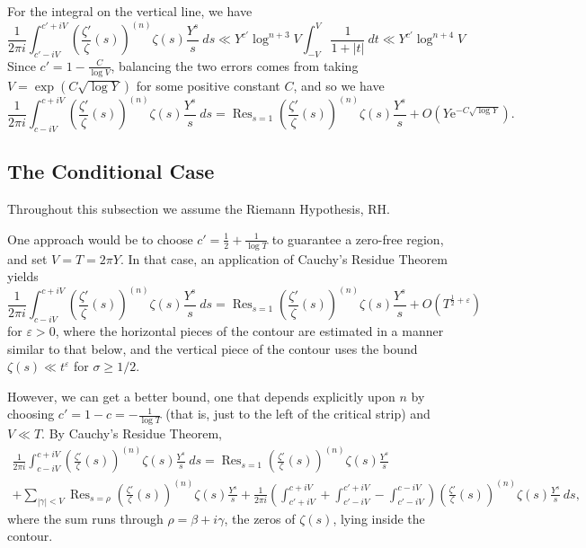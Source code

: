 \documentclass[12pt,a4paper,reqno]{amsart}
\DeclareMathOperator*{\Res}{Res}
\theoremstyle{remark}
\numberwithin{equation}{section}
\begin{document}
For the integral on the vertical line, we have
\[
    \frac{1}{2 \pi i } \int_{c' - iV}^{c' + iV} \left( \frac{\zeta'}{\zeta}(s) \right)^{(n)} \zeta(s) \frac{Y^s}{s} \ ds \ll Y^{c'} \log^{n+3} V \int_{-V}^{V} \frac{1}{1+|t|} \ dt  \ll  Y^{c'} \log^{n+4} V 
\]
Since $c' = 1-\frac{C}{\log V}$, balancing the two errors comes from taking $V = \exp(C\sqrt{\log Y})$ for some positive constant $C$, and so we have
\[
\frac{1}{2 \pi i } \int_{c- iV}^{c + iV}\left( \frac{\zeta'}{\zeta}(s) \right)^{(n)} \zeta(s) \frac{Y^s}{s} \ ds = \Res_{s=1} \left( \frac{\zeta'}{\zeta}(s) \right)^{(n)} \zeta(s) \frac{Y^s}{s} + O \left(Y \mathrm{e}^{-C \sqrt{\log Y}} \right).
\]




\subsection{The Conditional Case}
Throughout this subsection we assume the Riemann Hypothesis, RH. 

One approach would be to choose $c' = \frac{1}{2} + \frac{1}{\log T}$ to guarantee a zero-free region, and set $V=T=2\pi Y$. In that case, an application of Cauchy's Residue Theorem yields
\[
\frac{1}{2 \pi i } \int_{c- iV}^{c + iV}\left( \frac{\zeta'}{\zeta}(s) \right)^{(n)} \zeta(s) \frac{Y^s}{s} \ ds = \Res_{s=1} \left( \frac{\zeta'}{\zeta}(s) \right)^{(n)} \zeta(s) \frac{Y^s}{s} + O \left( T^{\frac{1}{2} + \varepsilon}\right)
\]
for $\varepsilon >0$, where the horizontal pieces of the contour are estimated in a manner similar to that below, and the vertical piece of the contour uses the bound $\zeta(s) \ll t^{\varepsilon}$ for $\sigma \geq 1/2$.

However, we can get a better bound, one that depends explicitly upon $n$ by choosing $c' = 1- c = - \frac{1}{\log T}$ (that is, just to the left of the critical strip) and $V \ll T$. By Cauchy's Residue Theorem,
\begin{multline*}
    \frac{1}{2 \pi i } \int_{c- iV}^{c + iV} \left( \frac{\zeta'}{\zeta}(s) \right)^{(n)} \zeta(s) \frac{Y^s}{s} \ ds = \Res_{s=1} \left( \frac{\zeta'}{\zeta}(s) \right)^{(n)} \zeta(s) \frac{Y^s}{s} \\ + \sum_{|\gamma|<V} \Res_{s=\rho} \left( \frac{\zeta'}{\zeta}(s) \right)^{(n)} \zeta(s) \frac{Y^s}{s} 
    + \frac{1}{2 \pi i } \left(\int_{c' + iV}^{c + iV} + \int_{c' - iV}^{c' + iV} - \int_{c' - iV}^{c - iV} \right) \left( \frac{\zeta'}{\zeta}(s) \right)^{(n)} \zeta(s) \frac{Y^s}{s} \ ds,
\end{multline*}
where the sum runs through $\rho = \beta + i\gamma$, the zeros of $\zeta (s)$, lying inside the contour.
\end{document}
